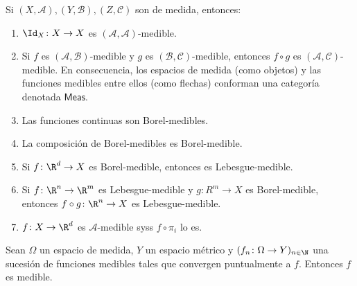 \begin{prop}
	Si $(X, \mathcal{A}), (Y, \mathcal{B}), (Z,\mathcal{C})$ son de medida, entonces:
	\begin{enumerate}
		\item $\Id_X \colon X \to X$ es $( \mathcal{A, A} )$-medible.
		\item Si $f$ es $(\mathcal{A,B})$-medible y $g$ es $(\mathcal{B, C})$-medible, entonces $f\circ g$ es $(\mathcal{A, C})$-medible.
			En consecuencia, los espacios de medida (como objetos) y las funciones medibles entre ellos (como flechas)
			conforman una categoría denotada $\mathsf{Meas}$.
		\item Las funciones continuas son Borel-medibles.
		\item La composición de Borel-medibles es Borel-medible.
		\item Si $f\colon \R^d \to X$ es Borel-medible, entonces es Lebesgue-medible.
		\item Si $f\colon \R^n \to \R^m$ es Lebesgue-medible y $g\colon R^m \to X$ es Borel-medible,
			entonces $f\circ g\colon \R^n \to X$ es Lebesgue-medible.
		\item $f\colon X\to\R^d$ es $\mathcal{A}$-medible syss $f\circ\pi_i$ lo es.
	\end{enumerate}
\end{prop}
\begin{prop}
	Sean $\Omega$ un espacio de medida, $Y$ un espacio métrico y $(f_n\colon\Omega \to Y)_{n\in\N}$ una sucesión de funciones
	medibles tales que convergen puntualmente a $f$. Entonces $f$ es medible.
\end{prop}

